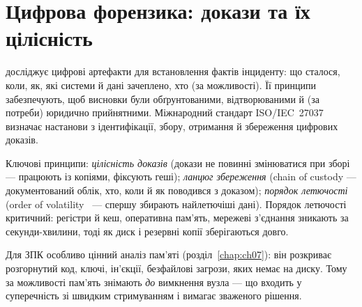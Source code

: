 \section{Цифрова форензика: докази та їх цілісність}\label{sec:ch16-forensics}

 досліджує цифрові артефакти для встановлення фактів інциденту: що сталося, коли, як, які системи й дані зачеплено, хто (за можливості). Її принципи~\cite{ch16:casey,ch16:carrier} забезпечують, щоб висновки були обґрунтованими, відтворюваними й (за потреби) юридично прийнятними. Міжнародний стандарт ISO/IEC~27037~\cite{ch16:iso27037} визначає настанови з ідентифікації, збору, отримання й збереження цифрових доказів.

Ключові принципи: \emph{цілісність доказів} (докази не повинні змінюватися при зборі --- працюють із копіями, фіксують геші); \emph{ланцюг збереження} (chain of custody --- документований облік, хто, коли й як поводився з доказом); \emph{порядок летючості} (order of volatility~\cite{ch16:orderofvolatility} --- спершу збирають найлетючіші дані). Порядок летючості критичний: регістри й кеш, оперативна пам'ять, мережеві з'єднання зникають за секунди-хвилини, тоді як диск і резервні копії зберігаються довго.

\begin{tikzfig}
\end{tikzfig}

Для ЗПК особливо цінний аналіз пам'яті (розділ~\ref{chap:ch07}): він розкриває розгорнутий код, ключі, ін'єкції, безфайлові загрози, яких немає на диску. Тому за можливості пам'ять знімають \emph{до} вимкнення вузла --- що входить у суперечність зі швидким стримуванням і вимагає зваженого рішення.

